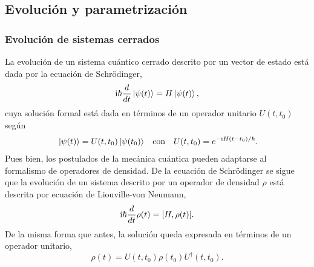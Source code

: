 \subsection{Evolución y parametrización}

\subsubsection{Evolución de sistemas cerrados}

La evolución de un sistema cuántico cerrado descrito por un vector de estado está dada por la ecuación de Schrödinger,
\begin{equation}
    \text{i}\hbar\frac{d}{dt}\ket{\psi(t)}=H\ket{\psi(t)},\nonumber
\end{equation}
cuya solución formal está dada en términos de un operador unitario $U(t,t_{0})$ según
\begin{align}
    \ket{\psi(t)}=U(t,t_{0})\ket{\psi(t_{0})} && \text{con} && U(t,t_{0})=e^{-\rmi H(t-t_{0})/\hbar}\rlap{.}\nonumber
\end{align}
Pues bien, los postulados de la mecánica cuántica pueden adaptarse al formalismo de operadores de densidad. De la ecuación de Schrödinger se sigue que la evolución de un sistema descrito por un operador de densidad $\rho$ está descrita por ecuación de Liouville-von Neumann,
\begin{equation}
    \text{i}\hbar\frac{d}{d t} \rho(t)=[H,\rho(t)].\nonumber
\end{equation}
De la misma forma que antes, la solución queda expresada en términos de un operador unitario,
\begin{equation}
    \rho(t)=U(t,t_{0})\rho(t_{0})U^{\dagger}(t,t_{0}).\nonumber
\end{equation}
